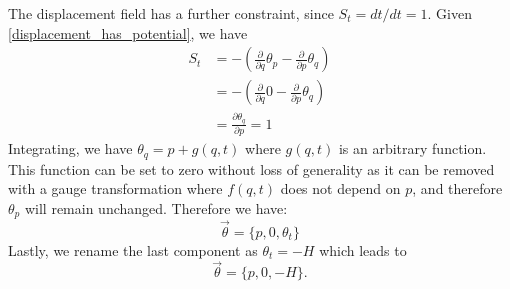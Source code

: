 \documentclass[10pt,twocolumn, nofootinbib]{revtex4-2}
\begin{document}
The displacement field has a further constraint, since $S_t = dt/ dt = 1$. Given \ref{displacement_has_potential}, we have
\begin{align*}
	S_t &= - \left(\frac{\partial}{\partial q}  \theta_p - \frac{\partial}{\partial p}  \theta_q\right) \\
	&= - \left(\frac{\partial}{\partial q}  0 - \frac{\partial}{\partial p}  \theta_q\right) \\
	& = \frac{\partial \theta_q}{\partial p} = 1
\end{align*}
Integrating, we have $\theta_q = p + g(q,t)$ where $g(q,t)$ is an arbitrary function. This function can be set to zero without loss of generality as it can be removed with a gauge transformation where $f(q,t)$ does not depend on $p$, and therefore $\theta_p$ will remain unchanged. Therefore we have:
\begin{equation}
	\vec{\theta} = \{p, 0, \theta_t\}
\end{equation}
Lastly, we rename the last component as $\theta_t = -H$ which leads to 
\begin{equation}\label{potential_final}
	\vec{\theta} = \{p, 0, -H\}.
\end{equation}
\end{document}
